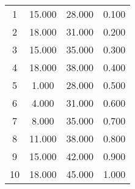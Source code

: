 % 
\begin{tabular}{cccc}
  \hline
  \hline
1 & 15.000 & 28.000 & 0.100 \\ 
  2 & 18.000 & 31.000 & 0.200 \\ 
  3 & 15.000 & 35.000 & 0.300 \\ 
  4 & 18.000 & 38.000 & 0.400 \\ 
  5 & 1.000 & 28.000 & 0.500 \\ 
  6 & 4.000 & 31.000 & 0.600 \\ 
  7 & 8.000 & 35.000 & 0.700 \\ 
  8 & 11.000 & 38.000 & 0.800 \\ 
  9 & 15.000 & 42.000 & 0.900 \\ 
  10 & 18.000 & 45.000 & 1.000 \\ 
   \hline
\end{tabular}
